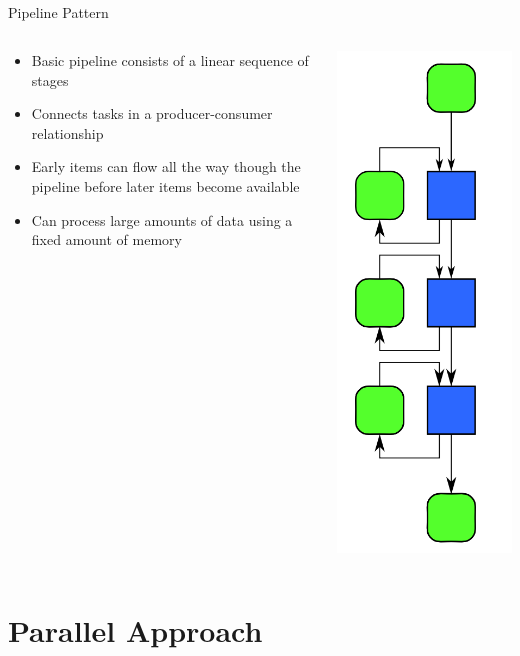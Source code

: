 \documentclass[xcolor=dvipsnames]{beamer}
\begin{document}
		\subsection{} 
		  \begin{frame}{Pipeline Pattern}
				\begin{columns}
					\begin{column}{0.65\textwidth}
						\begin{itemize}
							\item Basic pipeline consists of a linear sequence of stages
							\item Connects tasks in a producer-consumer relationship
							\item Early items can flow all the way though the pipeline before later items become available 
							\item Can process large amounts of data using a fixed amount of memory
						\end{itemize}
					\end{column}
					\begin{column}{0.35\textwidth}
						\centering \includegraphics[width=1.in]{images/pipelinePattern}
					\end{column}
				\end{columns}
			\end{frame}
		
	
	\section{Parallel Approach}
\end{document}
